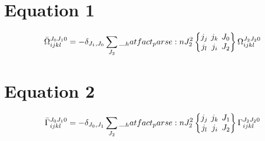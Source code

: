 \documentclass{scrartcl}
\newcommand{\sixj}[6]{\begingroup\setlength{\arraycolsep}{0.2em}\begin{Bmatrix} #1 & #2 & #3 \\ #4 & #5 & #6 \end{Bmatrix}\endgroup}
\begin{document}
\section{Equation 1}
\begin{dmath*}
\bar{\Omega}_{i j k l}^{{J}_{0} {J}_{1} 0} = -\delta_{{J}_{1},{J}_{0}} \* \sum_{{J}_{2}} \* \hatfact{{J}_{2}^{2}} \* \sixj{{j}_{j}}{{j}_{k}}{{J}_{0}}{{j}_{l}}{{j}_{i}}{{J}_{2}} \* \Omega_{i j k l}^{{J}_{2} {J}_{2} 0}
\end{dmath*}

\section{Equation 2}
\begin{dmath*}
\bar{\Gamma}_{i j k l}^{{J}_{0} {J}_{1} 0} = -\delta_{{J}_{0},{J}_{1}} \* \sum_{{J}_{2}} \* \hatfact{{J}_{2}^{2}} \* \sixj{{j}_{j}}{{j}_{k}}{{J}_{1}}{{j}_{l}}{{j}_{i}}{{J}_{2}} \* \Gamma_{i j k l}^{{J}_{2} {J}_{2} 0}
\end{dmath*}
\end{document}
